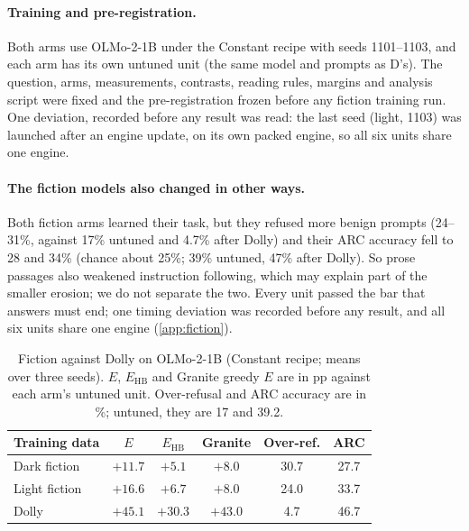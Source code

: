 \documentclass[11pt]{article}
\newcommand{\Ehb}{E_{\mathrm{HB}}}
\begin{document}
\paragraph{Training and pre-registration.} Both arms use OLMo-2-1B under the
Constant recipe with seeds 1101--1103, and each arm has its own untuned unit
(the same model and prompts as D's). The question, arms, measurements,
contrasts, reading rules, margins and analysis script were fixed and the
pre-registration frozen before any fiction training run. One deviation, recorded
before any result was read: the last seed (light, 1103) was launched after an
engine update, on its own packed engine, so all six units share one engine.

\paragraph{The fiction models also changed in other ways.} Both fiction arms
learned their task, but they refused more benign prompts (24--31\%, against
17\% untuned and 4.7\% after Dolly) and their ARC accuracy fell to 28 and 34\%
(chance about 25\%; 39\% untuned, 47\% after Dolly). So prose passages also
weakened instruction following, which may explain part of the smaller erosion;
we do not separate the two. Every unit passed the bar that answers must end;
one timing deviation was recorded before any result, and all six units share
one engine (\cref{app:fiction}).

\begin{table}[t]
  \caption{Fiction against Dolly on OLMo-2-1B (Constant recipe; means over
    three seeds). $E$, $\Ehb$ and Granite greedy $E$ are in pp against each
    arm's untuned unit. Over-refusal and ARC accuracy are in \%; untuned, they
    are 17 and 39.2.}
  \label{tab:fiction}
  \centering
  \small
  \setlength{\tabcolsep}{4pt}
  \begin{tabular}{@{}l c c c c c@{}}
    \toprule
    Training data & $E$ & $\Ehb$ & Granite & Over-ref. & ARC \\
    \midrule
    Dark fiction & $+11.7$ & $+5.1$ & $+8.0$ & 30.7 & 27.7 \\
    Light fiction & $+16.6$ & $+6.7$ & $+8.0$ & 24.0 & 33.7 \\
    Dolly & $+45.1$ & $+30.3$ & $+43.0$ & 4.7 & 46.7 \\
    \bottomrule
  \end{tabular}
\end{table}
\end{document}
